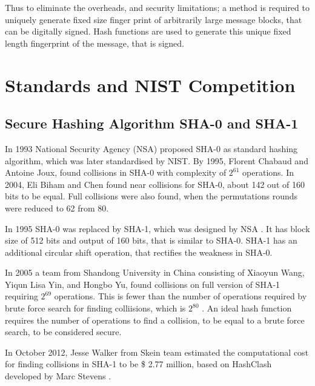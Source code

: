 Thus to eliminate the overheads, and security limitations; a method is required to uniquely generate fixed
size finger print of arbitrarily large message blocks, that can be digitally signed. Hash functions are used
to generate this unique fixed length fingerprint of the message, that is signed.

\section{Standards and NIST Competition} 

  \subsection{Secure Hashing Algorithm SHA-0 and SHA-1}

  In 1993 National Security Agency (NSA) proposed SHA-0 as standard hashing algorithm, which was later
  standardised by NIST. By 1995, Florent Chabaud and Antoine Joux, found collisions in SHA-0 
  with complexity of $2^{61}$ operations. In 2004, Eli Biham and Chen found near collisions for SHA-0, about 142 
  out of 160 bits to be equal. Full  collisions were also found, when the permutations rounds were reduced 
  to 62 from 80.

  In 1995 SHA-0 was replaced by SHA-1, which was designed by NSA \cite{00006, 00007}. It has block size of 
  512 bits and output of 160 bits, that is similar to SHA-0. SHA-1 has an additional circular shift operation, 
  that rectifies the weakness in SHA-0.

  In 2005 a team from Shandong University in China consisting of Xiaoyun Wang, Yiqun Lisa Yin, 
  and Hongbo Yu, found collisions on full version of SHA-1 requiring $2^{69}$ operations. 
  This is fewer than the number of operations required by brute force search for finding colliisions, which
  is $2^{80}$ \cite{00010}. An ideal hash function requires the number of operations to find a collision, 
  to be equal to a brute force search, to be considered secure. 

  In October 2012, Jesse Walker from Skein team estimated the computational cost for finding collisions 
  in SHA-1 to be \$ 2.77 million, based on HashClash developed by Marc Stevens \cite{00008}.

